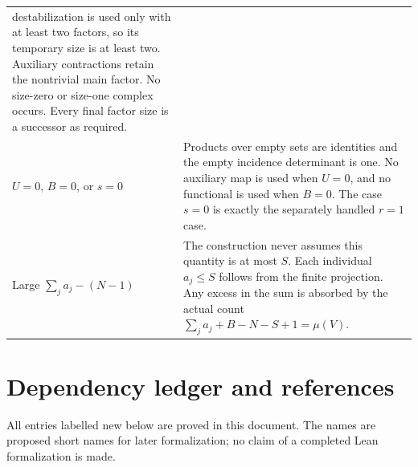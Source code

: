 \documentclass[11pt,a4paper]{article}
\theoremstyle{remark}
\begin{document}
\begin{longtable}{>{\raggedright\arraybackslash}p{}>{\raggedright\arraybackslash}p{}}
destabilization is used only with at least two factors, so its
temporary size is at least two.  Auxiliary contractions retain the
nontrivial main factor.  No size-zero or size-one complex occurs.
Every final factor size is a successor as required.\\[5pt]
$U=0$, $B=0$, or $s=0$ &
Products over empty sets are identities and the empty incidence
determinant is one.  No auxiliary map is used when $U=0$, and no
functional is used when $B=0$.  The case $s=0$ is exactly the
separately handled $r=1$ case.\\[5pt]
Large $\sum_j a_j-(N-1)$ &
The construction never assumes this quantity is at most $S$.
Each individual $a_j\le S$ follows from the finite projection.
Any excess in the sum is absorbed by the actual count
$\sum_j a_j+B-N-S+1=\mu(V)$.\\
\bottomrule
\end{longtable}

\section{Dependency ledger and references}
\label{sec:ledger}

All entries labelled new below are proved in this document.
The names are proposed short names for later formalization; no claim
of a completed Lean formalization is made.
\end{document}
